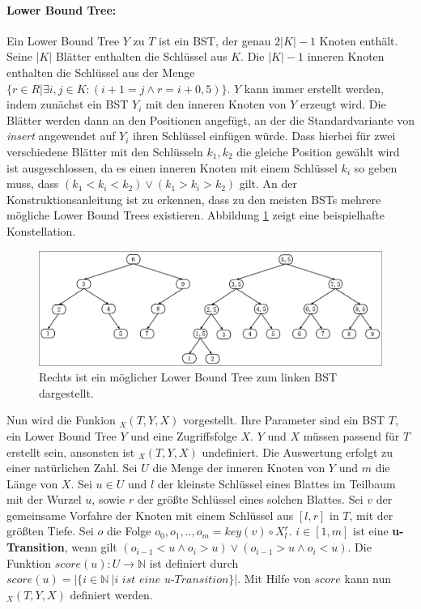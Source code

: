 \documentclass[a4paper,12pt]{article}
\begin{document}
\paragraph{Lower Bound Tree:} \label{wilberLowerBoundTree}
Ein Lower Bound Tree $Y$ zu $T$ ist ein BST, der genau $2 \vert K\vert  - 1$ Knoten enthält. Seine $\vert K \vert$ Blätter enthalten die Schlüssel aus $K$. Die $\vert K \vert - 1$ inneren Knoten enthalten die Schlüssel aus der Menge $\{r \in R \vert \exists i,j \in K \colon \left( i + 1 = j \land r = i + 0,5\right)\}$. $Y$ kann immer erstellt werden, indem zunächst ein BST $Y_i$ mit den inneren Knoten von $Y$ erzeugt wird. Die Blätter werden dann an den Positionen angefügt, an der die Standardvariante von \textit{insert} angewendet auf $Y_i$ ihren Schlüssel einfügen würde. Dass hierbei für zwei verschiedene Blätter mit den Schlüsseln $k_1, k_2$ die gleiche Position gewählt wird ist ausgeschlossen, da es einen inneren Knoten mit einem Schlüssel $k_i$ so geben muss, dass $\left(k_1 < k_i < k_2\right) \lor \left(k_1 > k_i > k_2 \right)$ gilt. An der Konstruktionsanleitung ist zu erkennen, dass zu den meisten BSTs mehrere mögliche Lower Bound Trees existieren. Abbildung \ref{fig:lowerBoundTree} zeigt eine beispielhafte Konstellation. \\



\begin{figure}[H]
	\centering
	\includegraphics[width=1\textwidth]{Medien/DynOpt/lowerBoundTree}
	\caption{Rechts ist ein möglicher Lower Bound Tree zum linken BST dargestellt.  }
	\label{fig:lowerBoundTree}
\end{figure}

\noindent Nun wird die Funkion $_X(T, Y, X) $ vorgestellt. Ihre Parameter sind ein BST $T$, ein Lower Bound Tree $Y$ und eine Zugriffsfolge $X$. $Y$ und $X$ müssen passend für $T$ erstellt sein, ansonsten ist $_X(T, Y, X) $ undefiniert. Die Auswertung erfolgt zu einer natürlichen Zahl. Sei $U$ die Menge der inneren Knoten von $Y$ und $m$ die Länge von $X$. Sei $u \in U$ und $l$ der kleinste Schlüssel eines Blattes im Teilbaum mit der Wurzel $u$, sowie $r$ der größte Schlüssel eines solchen Blattes. Sei $v$ der gemeinsame Vorfahre der Knoten mit einem Schlüssel aus $\left[l, r\right]$  in $T$, mit der größten Tiefe. Sei $o$ die Folge $o_0, o_1,..,o_m =  \mathit{key}(v) \circ X^r_l$. $i \in \left[1,m\right]$ ist eine  \mbox{\textbf{u-Transition}}, wenn gilt $\left( o_{i-1} < u \land o_i > u \right) \lor \left( o_{i-1} > u \land o_i < u \right)$. Die Funktion $\mathit{score}\left(u\right) \colon U \rightarrow \mathbb{N}$ ist definiert durch $\mathit{score}\left(u\right) = \vert\{i \in \mathbb{N}\ \vert \textit{i ist eine u-Transition}\} \vert$. Mit Hilfe von $\mathit{score}$ kann nun  $_X(T, Y, X) $ definiert werden.
\end{document}
